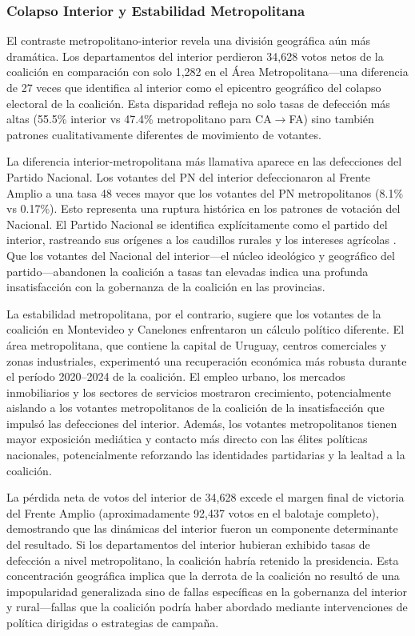 \subsubsection{Colapso Interior y Estabilidad Metropolitana}

El contraste metropolitano-interior revela una división geográfica aún más dramática. Los departamentos del interior perdieron 34,628 votos netos de la coalición en comparación con solo 1,282 en el Área Metropolitana---una diferencia de 27 veces que identifica al interior como el epicentro geográfico del colapso electoral de la coalición. Esta disparidad refleja no solo tasas de defección más altas (55.5\% interior vs 47.4\% metropolitano para CA$\to$FA) sino también patrones cualitativamente diferentes de movimiento de votantes.

La diferencia interior-metropolitana más llamativa aparece en las defecciones del Partido Nacional. Los votantes del PN del interior defeccionaron al Frente Amplio a una tasa 48 veces mayor que los votantes del PN metropolitanos (8.1\% vs 0.17\%). Esto representa una ruptura histórica en los patrones de votación del Nacional. El Partido Nacional se identifica explícitamente como el partido del interior, rastreando sus orígenes a los caudillos rurales y los intereses agrícolas \citep{buquet2015uruguayan}. Que los votantes del Nacional del interior---el núcleo ideológico y geográfico del partido---abandonen la coalición a tasas tan elevadas indica una profunda insatisfacción con la gobernanza de la coalición en las provincias.

La estabilidad metropolitana, por el contrario, sugiere que los votantes de la coalición en Montevideo y Canelones enfrentaron un cálculo político diferente. El área metropolitana, que contiene la capital de Uruguay, centros comerciales y zonas industriales, experimentó una recuperación económica más robusta durante el período 2020--2024 de la coalición. El empleo urbano, los mercados inmobiliarios y los sectores de servicios mostraron crecimiento, potencialmente aislando a los votantes metropolitanos de la coalición de la insatisfacción que impulsó las defecciones del interior. Además, los votantes metropolitanos tienen mayor exposición mediática y contacto más directo con las élites políticas nacionales, potencialmente reforzando las identidades partidarias y la lealtad a la coalición.

La pérdida neta de votos del interior de 34,628 excede el margen final de victoria del Frente Amplio (aproximadamente 92,437 votos en el balotaje completo), demostrando que las dinámicas del interior fueron un componente determinante del resultado. Si los departamentos del interior hubieran exhibido tasas de defección a nivel metropolitano, la coalición habría retenido la presidencia. Esta concentración geográfica implica que la derrota de la coalición no resultó de una impopularidad generalizada sino de fallas específicas en la gobernanza del interior y rural---fallas que la coalición podría haber abordado mediante intervenciones de política dirigidas o estrategias de campaña.

